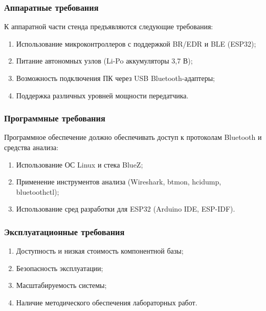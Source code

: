 \subsubsection{Аппаратные требования}

К аппаратной части стенда предъявляются следующие требования:
\begin{enumerate}[nosep]
    \item Использование микроконтроллеров с поддержкой BR/EDR и BLE (ESP32);
    \item Питание автономных узлов (Li-Po аккумуляторы 3{,}7 В);
    \item Возможность подключения ПК через USB Bluetooth-адаптеры;
    \item Поддержка различных уровней мощности передатчика.
\end{enumerate}

\subsubsection{Программные требования}

Программное обеспечение должно обеспечивать доступ к протоколам Bluetooth и средства анализа:
\begin{enumerate}[nosep]
    \item Использование ОС Linux и стека BlueZ;
    \item Применение инструментов анализа (Wireshark, btmon, hcidump, bluetoothctl);
    \item Использование сред разработки для ESP32 (Arduino IDE, ESP-IDF).
\end{enumerate}

\subsubsection{Эксплуатационные требования}

\begin{enumerate}[nosep]
    \item Доступность и низкая стоимость компонентной базы;
    \item Безопасность эксплуатации;
    \item Масштабируемость системы;
    \item Наличие методического обеспечения лабораторных работ.
\end{enumerate}

